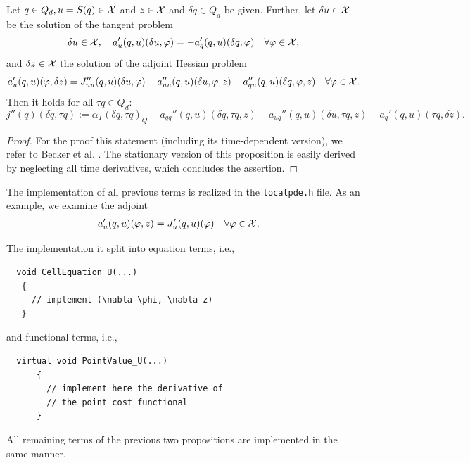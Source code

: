 \documentclass[prodmode,acmtoms]{acmsmall}
\numberwithin{equation}{section}
\renewcommand{\phi}{\varphi}
\begin{document}
\begin{proposition}
  \label{prop_newton_hessian}
  Let $q\in Q_d, u=S(q)\in {\cal X}$ and $z\in {\cal X}$ and  $\delta
  q\in Q_d$ be given. Further, let $\delta u\in {\cal X}$ be the
  solution of the tangent problem 
  \[
  \delta u\in{\cal X},\quad 
  a_{u}'(q,u)(\delta u , \phi) 
  = -a_{q}'(q,u)(\delta q , \phi)  \quad\forall \phi\in {\cal
    X},
  \]
  and $\delta z\in {\cal X}$ the solution of the adjoint Hessian 
  problem  
  \[
  a_{u}'(q,u)(\phi, \delta z)
  = J''_{uu}(q,u)(\delta u, \phi)
  - a_{uu}''(q,u)(\delta u, \phi, z)
  - a_{qu}''(q,u)(\delta q , \phi, z)  \quad\forall \phi\in
  {\cal X}. 
  \]
 Then it holds  for all $\tau q\in Q_d$:
  \[
  j''(q)(\delta q, \tau q):= 
  \alpha_T (\delta q , \tau q)_Q -
  a_{qq}''(q, u)(\delta q, \tau q , z) -
  a_{uq}''(q,u)(\delta u, \tau q , z) -
  a_{q}'(q,u)(\tau q , \delta z).
  \]
\end{proposition}
\begin{proof}
  For the proof this statement (including its time-dependent version), we refer to 
  Becker et al. \cite{BeMeVe06}.
  The stationary version of this proposition is easily derived by neglecting 
  all time derivatives, which concludes the assertion. 
\end{proof}
The implementation of all previous terms 
is realized in the \texttt{localpde.h} file.
As an example, we examine the adjoint 
\begin{equation}
  \label{opt_KKT_system}
  \begin{aligned}
    a_{u}'(q,u)(\phi , z) &= J'_{u}(q,u)(\phi) & \forall \phi&\in {\cal X},
  \end{aligned}
\end{equation}

The implementation it split into equation terms, i.e., 
\begin{lstlisting} 
  void CellEquation_U(...)
   {
     // implement (\nabla \phi, \nabla z)
   }
\end{lstlisting}
and functional terms, i.e.,     
\begin{lstlisting} 
  virtual void PointValue_U(...)
      {
        // implement here the derivative of 
        // the point cost functional
      }
\end{lstlisting}
All remaining terms of the previous two propositions 
are implemented in the same manner.
\end{document}
